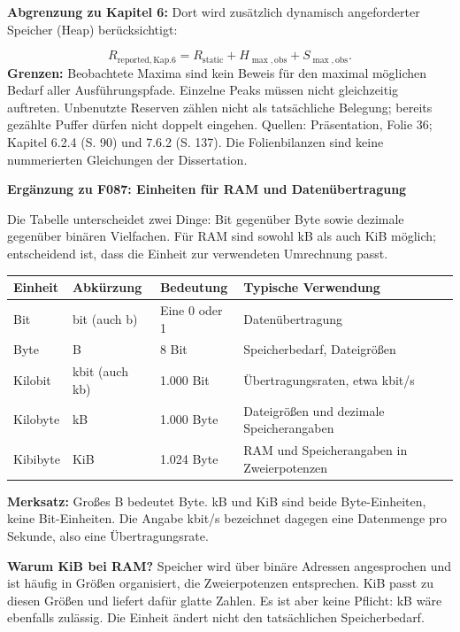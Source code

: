 \documentclass[11pt,a4paper]{article}
\begin{document}
\textbf{Abgrenzung zu Kapitel 6:} Dort wird zusätzlich dynamisch angeforderter Speicher (Heap) berücksichtigt:

\[ R_{\mathrm{reported,Kap.6}}=R_{\mathrm{static}}+H_{\max,\mathrm{obs}}+S_{\max,\mathrm{obs}}. \]
\textbf{Grenzen:} Beobachtete Maxima sind kein Beweis für den maximal möglichen Bedarf aller Ausführungspfade. Einzelne Peaks müssen nicht gleichzeitig auftreten. Unbenutzte Reserven zählen nicht als tatsächliche Belegung; bereits gezählte Puffer dürfen nicht doppelt eingehen. Quellen: Präsentation, Folie 36; Kapitel 6.2.4 (S. 90) und 7.6.2 (S. 137). Die Folienbilanzen sind keine nummerierten Gleichungen der Dissertation.

\clearpage
\textbf{Ergänzung zu F087: Einheiten für RAM und Datenübertragung}

Die Tabelle unterscheidet zwei Dinge: Bit gegenüber Byte sowie dezimale gegenüber binären Vielfachen. Für RAM sind sowohl kB als auch KiB möglich; entscheidend ist, dass die Einheit zur verwendeten Umrechnung passt.

\begin{center}\renewcommand{\arraystretch}{1.5}\begin{tabular}{|p{2.1cm}|p{2.0cm}|p{3.2cm}|p{7.0cm}|}\hline \textbf{Einheit}&\textbf{Abkürzung}&\textbf{Bedeutung}&\textbf{Typische Verwendung}\\\hline Bit&bit (auch b)&Eine 0 oder 1&Datenübertragung\\\hline Byte&B&8 Bit&Speicherbedarf, Dateigrößen\\\hline Kilobit&kbit (auch kb)&1.000 Bit&Übertragungsraten, etwa kbit/s\\\hline Kilobyte&kB&1.000 Byte&Dateigrößen und dezimale Speicherangaben\\\hline Kibibyte&KiB&1.024 Byte&RAM und Speicherangaben in Zweierpotenzen\\\hline\end{tabular}\end{center}
\textbf{Merksatz:} Großes B bedeutet Byte. kB und KiB sind beide Byte-Einheiten, keine Bit-Einheiten. Die Angabe kbit/\allowbreak{}s bezeichnet dagegen eine Datenmenge pro Sekunde, also eine Übertragungsrate.

\textbf{Warum KiB bei RAM?} Speicher wird über binäre Adressen angesprochen und ist häufig in Größen organisiert, die Zweierpotenzen entsprechen. KiB passt zu diesen Größen und liefert dafür glatte Zahlen. Es ist aber keine Pflicht: kB wäre ebenfalls zulässig. Die Einheit ändert nicht den tatsächlichen Speicherbedarf.
\end{document}
